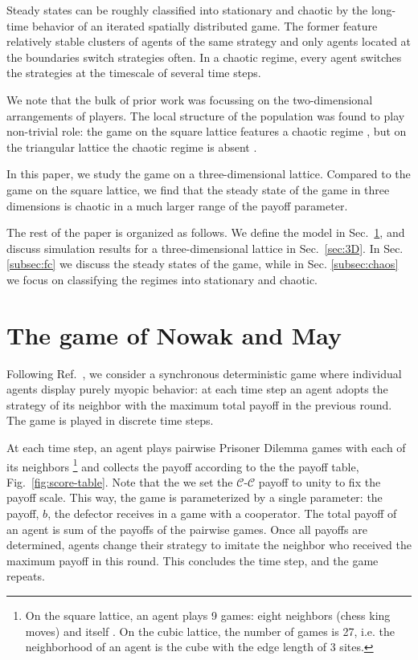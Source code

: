 \documentclass[a4paper]{jpconf}
\begin{document}
Steady states can be roughly classified into stationary and chaotic by the long-time behavior of
an iterated spatially distributed game. The former feature relatively stable clusters of agents of the same
strategy and only agents located at the boundaries switch strategies often. In a chaotic regime, every
agent switches the strategies at the timescale of several time steps.

We note that the bulk of prior work was focussing on the two-dimensional arrangements of
players. The local structure of the population was found to play non-trivial
role: the game on the square lattice features a chaotic regime \cite{Nowak1992}, 
but on the triangular lattice the chaotic regime is absent \cite{Burovski2019}.

In this paper, we study the game on a three-dimensional lattice. Compared to 
the game on the square lattice, we find that
the steady state of the game in three dimensions is chaotic in a much larger 
range of the payoff parameter.

The rest of the paper is organized as follows. We define the model in
Sec.\ \ref{sec:model}, and discuss simulation results for a three-dimensional
lattice in Sec.\ \ref{sec:3D}. In Sec. \ref{subsec:fc} we discuss the steady
states of the game, while in Sec. \ref{subsec:chaos} we focus on classifying the
regimes into stationary and chaotic.


\section{The game of Nowak and May}
\label{sec:model}

Following Ref.\ \cite{Nowak1992}, we consider a synchronous deterministic game
where individual agents display purely myopic behavior: at each time step
an agent adopts the strategy of its neighbor with the maximum total payoff
in the previous round. The game is played in discrete time steps. 

At each time step, an agent plays pairwise Prisoner Dilemma games with 
each of its neighbors%
%
\footnote{On the square lattice, an agent plays 9 games: eight neighbors (chess king moves)
and itself \cite{Nowak1993}. On the cubic lattice, the number of games is 27, i.e.
the neighborhood of an agent is the cube with the edge length of 3 sites.}
%
%
and collects the payoff according to the the payoff
table, Fig.\ \ref{fig:score-table}.  Note that the we set the
$\mathcal{C}$-$\mathcal{C}$ payoff to unity to fix the payoff scale. This way, the
game is parameterized by a single parameter: the payoff, $b$, the defector receives
in a game with a cooperator. 
The total payoff of an agent is sum of the payoffs of the pairwise games. Once all 
payoffs are determined, agents change their strategy to imitate the neighbor
who received the maximum payoff in this round. This concludes the time step,
and the game repeats.
\end{document}
